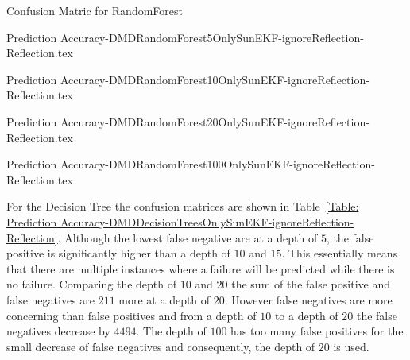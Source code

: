 \documentclass[letterpaper, 10 pt, conference]{ieeeconf}  %
\begin{document}
\begin{table*}
	\caption{Confusion Matric for RandomForest} 
	\label{Table: Prediction Accuracy-DMDRandomForestOnlySunEKF-ignoreReflection-Reflection} 
	\centering
	\begin{minipage}[c]{0.2\textwidth}
		{Prediction Accuracy-DMDRandomForest5OnlySunEKF-ignoreReflection-Reflection.tex}
	\end{minipage}
	\begin{minipage}[c]{0.2\textwidth}
		{Prediction Accuracy-DMDRandomForest10OnlySunEKF-ignoreReflection-Reflection.tex}
	\end{minipage}
	\begin{minipage}[c]{0.2\textwidth}
		{Prediction Accuracy-DMDRandomForest20OnlySunEKF-ignoreReflection-Reflection.tex}
	\end{minipage}
	\begin{minipage}[c]{0.2\textwidth}
		{Prediction Accuracy-DMDRandomForest100OnlySunEKF-ignoreReflection-Reflection.tex}
	\end{minipage}
\end{table*}

For the Decision Tree the confusion matrices are shown in Table~\ref{Table: Prediction Accuracy-DMDDecisionTreesOnlySunEKF-ignoreReflection-Reflection}. Although the lowest false negative are at a depth of $5$, the false positive is significantly higher than a depth of $10$ and $15$. This essentially means that there are multiple instances where a failure will be predicted while there is no failure. Comparing the depth of $10$ and $20$ the sum of the false positive and false negatives are $211$ more at a depth of $20$. However false negatives are more concerning than false positives and from a depth of $10$ to a depth of $20$ the false negatives decrease by $4494$. The depth of $100$ has too many false positives for the small decrease of false negatives and consequently, the depth of $20$ is used.
\end{document}
